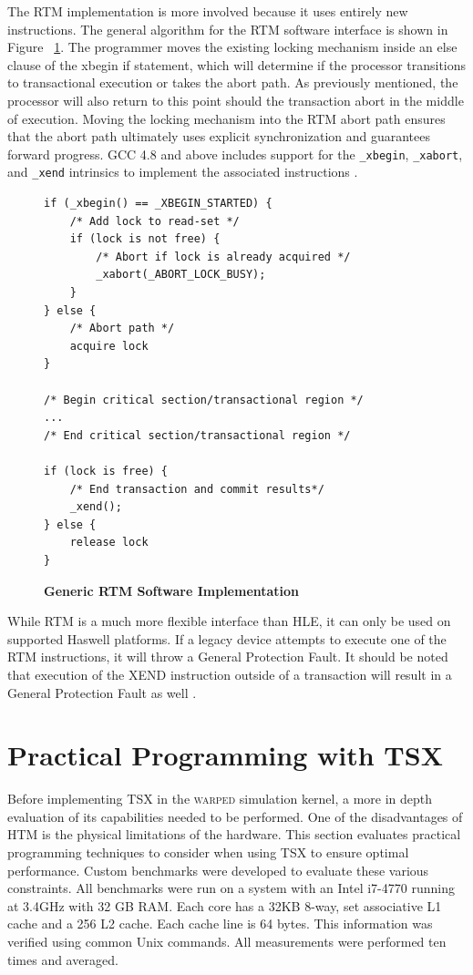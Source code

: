 \documentclass[11pt]{book}
\begin{document}
The RTM implementation is more involved because it uses entirely new
instructions.  The general algorithm for the RTM software interface is shown in
Figure ~\ref{fig:rtm_interface}.  The programmer moves the existing locking
mechanism inside an else clause of the xbegin if statement, which will determine
if the processor transitions to transactional execution or takes the abort path.
As previously mentioned, the processor will also return to this point should the
transaction abort in the middle of execution. Moving the locking mechanism into
the RTM abort path ensures that the abort path ultimately uses explicit
synchronization and guarantees forward progress.  GCC 4.8 and above includes
support for the \texttt{\_xbegin}, \texttt{\_xabort}, and \texttt{\_xend}
intrinsics to implement the associated instructions \cite{gcc}.

\linespread{1.0}
\begin{figure}
\begin{verbatim}
if (_xbegin() == _XBEGIN_STARTED) {
    /* Add lock to read-set */
    if (lock is not free) {
        /* Abort if lock is already acquired */
        _xabort(_ABORT_LOCK_BUSY);
    }
} else {
    /* Abort path */
    acquire lock
}

/* Begin critical section/transactional region */
...
/* End critical section/transactional region */

if (lock is free) {
    /* End transaction and commit results*/
    _xend();
} else {
    release lock
}
\end{verbatim}
    \caption{\textbf{Generic RTM Software Implementation}}
    \label{fig:rtm_interface}
\end{figure}

While RTM is a much more flexible interface than HLE, it can only be used on supported
Haswell platforms.  If a legacy device attempts to execute one of the RTM instructions, it
will throw a General Protection Fault.  It should be noted that execution of the XEND
instruction outside of a transaction will result in a General Protection Fault as well
\cite{intel_opt_man}.

\chapter{Practical Programming with TSX}

Before implementing TSX in the \textsc{warped} simulation kernel, a more in depth
evaluation of its capabilities needed to be performed.  One of the disadvantages
of HTM is the physical limitations of the hardware.  This section evaluates
practical programming techniques to consider when using TSX to ensure optimal
performance.  Custom benchmarks were developed to evaluate these various
constraints.  All benchmarks were run on a system with an Intel i7-4770 running
at 3.4GHz with 32 GB RAM.  Each core has a 32KB 8-way, set associative L1 cache
and a 256 L2 cache.  Each cache line is 64 bytes.  This information was verified
using common Unix commands.  All measurements were performed ten times and
averaged.
\end{document}
